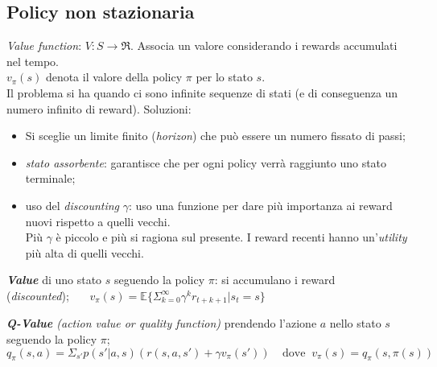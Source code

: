 \documentclass[a4paper, notitlepage, 9pt]{extreport}
\begin{document}
\subsection*{Policy non stazionaria}
\textit{Value function}: $V: S \rightarrow \mathfrak{R}$. Associa un valore considerando i rewards accumulati nel tempo.\\
$v_\pi(s)$ denota il valore della policy $\pi$ per lo stato $s$.\\
Il problema si ha quando ci sono infinite sequenze di stati (e di conseguenza un numero infinito di reward). Soluzioni:
\begin{itemize}
	\item Si sceglie un limite finito (\textit{horizon}) che può essere un numero fissato di passi;
	\item \textit{stato assorbente}: garantisce che per ogni policy verrà raggiunto uno stato terminale;
	\item uso del \textit{discounting} $\gamma$: uso una funzione per dare più importanza ai reward nuovi rispetto a quelli vecchi.\\
	Più $\gamma$ è piccolo e più si ragiona sul presente. I reward recenti hanno un'\textit{utility} più alta di quelli vecchi.
	\newline
\end{itemize}

\noindent
\textit{\textbf{Value}} di uno stato $s$ seguendo la policy $\pi$: si accumulano i reward (\textit{discounted});~~~ $v_\pi(s) = \mathbb{E}\{\Sigma_{k=0}^\infty \gamma^k r_{t+k+1} | s_t = s \}$

\noindent
\textit{\textbf{Q-Value} (action value or quality function)} prendendo l'azione $a$ nello stato $s$ seguendo la policy $\pi$;
$$q_\pi(s, a) = \Sigma_{s'} p(s' | a, s) (r(s, a, s')+\gamma v_\pi(s')) ~~~~~ \text{dove }~ v_\pi(s) = q_\pi(s, \pi(s))$$
\end{document}
